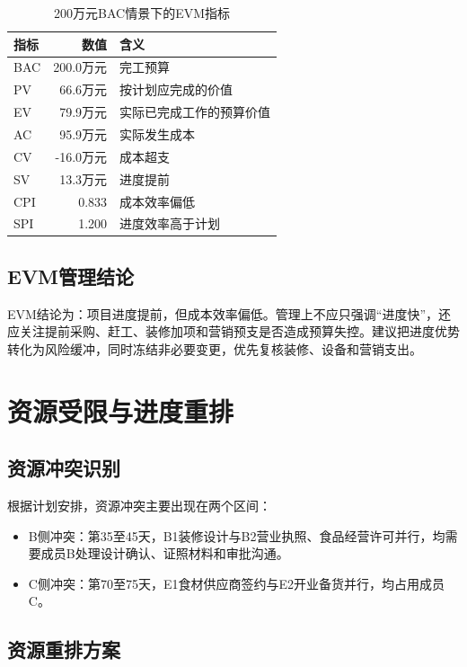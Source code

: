 \documentclass[UTF8,zihao=-4]{ctexart}
\begin{document}
\begin{table}[H]
  \centering
  \caption{200万元BAC情景下的EVM指标}
  \begin{tabular}{lrl}
    \toprule
    指标 & 数值 & 含义 \\
    \midrule
    BAC & 200.0万元 & 完工预算 \\
    PV & 66.6万元 & 按计划应完成的价值 \\
    EV & 79.9万元 & 实际已完成工作的预算价值 \\
    AC & 95.9万元 & 实际发生成本 \\
    CV & -16.0万元 & 成本超支 \\
    SV & 13.3万元 & 进度提前 \\
    CPI & 0.833 & 成本效率偏低 \\
    SPI & 1.200 & 进度效率高于计划 \\
    \bottomrule
  \end{tabular}
\end{table}

\subsection{EVM管理结论}

EVM结论为：项目进度提前，但成本效率偏低。管理上不应只强调“进度快”，还应关注提前采购、赶工、装修加项和营销预支是否造成预算失控。建议把进度优势转化为风险缓冲，同时冻结非必要变更，优先复核装修、设备和营销支出。

\section{资源受限与进度重排}

\subsection{资源冲突识别}

根据计划安排，资源冲突主要出现在两个区间：

\begin{itemize}
  \item B侧冲突：第35至45天，B1装修设计与B2营业执照、食品经营许可并行，均需要成员B处理设计确认、证照材料和审批沟通。
  \item C侧冲突：第70至75天，E1食材供应商签约与E2开业备货并行，均占用成员C。
\end{itemize}

\subsection{资源重排方案}
\end{document}
